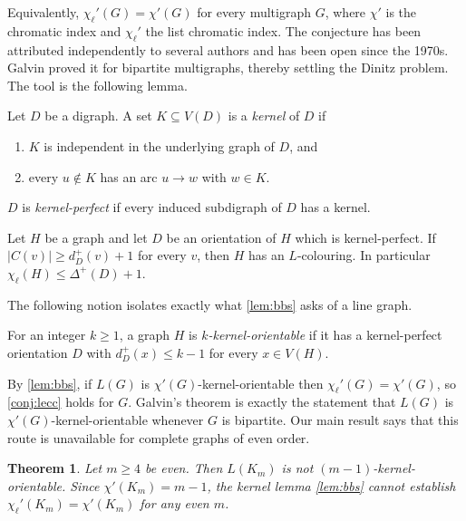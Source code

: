 \documentclass[11pt]{article}
\numberwithin{equation}{section}
\theoremstyle{plain}
\newtheorem{theorem}{Theorem}[section]
\newcommand{\dip}{d^{+}}
\newcommand{\chl}{\chi_{\ell}}
\newcommand{\chpl}{\chi_{\ell}'}
\newcommand{\LG}{L}
\begin{document}
Equivalently, $\chpl(G)=\chi'(G)$ for every multigraph $G$, where $\chi'$ is the chromatic
index and $\chpl$ the list chromatic index. The conjecture has been attributed independently
to several authors and has been open since the 1970s. Galvin proved it for bipartite
multigraphs, thereby settling the Dinitz problem. The tool is the following lemma.

\begin{definition}[kernel]\label{def:kernel}
Let $D$ be a digraph. A set $K\subseteq V(D)$ is a \emph{kernel} of $D$ if
\begin{enumerate}[label=\textup{(\roman*)}]
  \item $K$ is independent in the underlying graph of $D$, and
  \item every $u\notin K$ has an arc $u\to w$ with $w\in K$.
\end{enumerate}
$D$ is \emph{kernel-perfect} if every induced subdigraph of $D$ has a kernel.
\end{definition}

\begin{lemma}\label{lem:bbs}
Let $H$ be a graph and let $D$ be an orientation of $H$ which is kernel-perfect. If
$|C(v)|\ge\dip_D(v)+1$ for every $v$, then $H$ has an $L$-colouring. In particular
$\chl(H)\le\Delta^{+}(D)+1$.
\end{lemma}

The following notion isolates exactly what \cref{lem:bbs} asks of a line graph.

\begin{definition}\label{def:orientable}
For an integer $k\ge 1$, a graph $H$ is \emph{$k$-kernel-orientable} if it has a
kernel-perfect orientation $D$ with $\dip_D(x)\le k-1$ for every $x\in V(H)$.
\end{definition}

By \cref{lem:bbs}, if $\LG(G)$ is $\chi'(G)$-kernel-orientable then $\chpl(G)=\chi'(G)$, so
\cref{conj:lecc} holds for $G$. Galvin's theorem is exactly the statement that $\LG(G)$ is
$\chi'(G)$-kernel-orientable whenever $G$ is bipartite. Our main result says that this route
is unavailable for complete graphs of even order.

\begin{theorem}\label{thm:main}
Let $m\ge 4$ be even. Then $\LG(K_m)$ is \emph{not} $(m-1)$-kernel-orientable. Since
$\chi'(K_m)=m-1$, the kernel lemma \cref{lem:bbs} cannot establish
$\chpl(K_m)=\chi'(K_m)$ for any even $m$.
\end{theorem}
\end{document}
